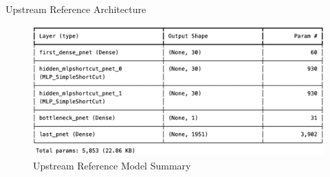\documentclass{beamer}
\begin{document}
\begin{frame}{Upstream Reference Architecture}
    \begin{figure}
        \includegraphics[width=\textwidth]{upstream-model.png}
        \caption{Upstream Reference Model Summary}
    \end{figure}
\end{frame}
\end{document}
